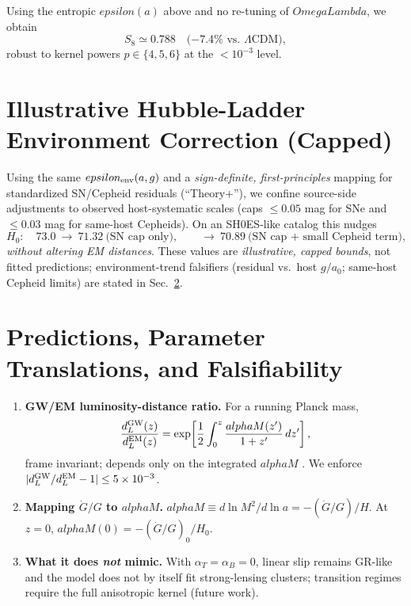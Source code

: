 \documentclass[aps,prd,onecolumn,superscriptaddress,nofootinbib]{revtex4-2}
\def\OmL{OmegaLambda}%
\def\alphaM{alphaM}%
\def\eps{epsilon}%
\newcommand{\OmL}{\Omega_\Lambda}
\newcommand{\alphaM}{\alpha_M}
\newcommand{\eps}{\varepsilon}
\begin{document}
Using the entropic $\eps(a)$ above and no re-tuning of $\OmL$, we obtain
\begin{equation}
S_8\simeq 0.788\quad \text{($-7.4\%$ vs.\ $\Lambda$CDM)},
\end{equation}
robust to kernel powers $p\in\{4,5,6\}$ at the $<10^{-3}$ level.

\section{Illustrative Hubble-Ladder Environment Correction (Capped)}
\label{sec:h0-illustration}
Using the same $\eps_{\rm env}(a,g)$ and a \emph{sign-definite, first-principles} mapping for standardized SN/Cepheid residuals (``Theory+''), we confine source-side adjustments to observed host-systematic scales (caps $\le 0.05$ mag for SNe and $\le 0.03$ mag for same-host Cepheids). On an SH0ES-like catalog this nudges
\begin{equation}
H_0:\quad 73.0 \ \to\ 71.32\ \text{(SN cap only)},\qquad \to\ 70.89\ \text{(SN cap + small Cepheid term)},
\end{equation}
\emph{without altering EM distances}. These values are \emph{illustrative, capped bounds}, not fitted predictions; environment-trend falsifiers (residual vs.\ host $g/a_0$; same-host Cepheid limits) are stated in Sec.~\ref{sec:predictions}.

\section{Predictions, Parameter Translations, and Falsifiability}
\label{sec:predictions}
\begin{enumerate}[leftmargin=1.3em]
\item \textbf{GW/EM luminosity-distance ratio.} For a running Planck mass,
\begin{equation}
\frac{d_L^{\rm GW}(z)}{d_L^{\rm EM}(z)} = \exp\!\left[ \frac{1}{2}\int_{0}^{z} \frac{\alphaM(z')}{1+z'}\,dz' \right],
\end{equation}
frame invariant; depends only on the integrated $\alphaM$ \cite{LombriserTaylor2016}. We enforce $|d_L^{\rm GW}/d_L^{\rm EM}-1|\le 5\times10^{-3}$.
\item \textbf{Mapping $\dot G/G$ to $\alphaM$.}
$\alphaM \equiv d\ln M^2/d\ln a = -(\dot G/G)/H$. At $z=0$, $\alphaM(0)=-(\dot G/G)_0/H_0$.
\item \textbf{What it does \emph{not} mimic.} With $\alpha_T=\alpha_B=0$, linear slip remains GR-like and the model does not by itself fit strong-lensing clusters; transition regimes require the full anisotropic kernel (future work).
\end{enumerate}
\end{document}
